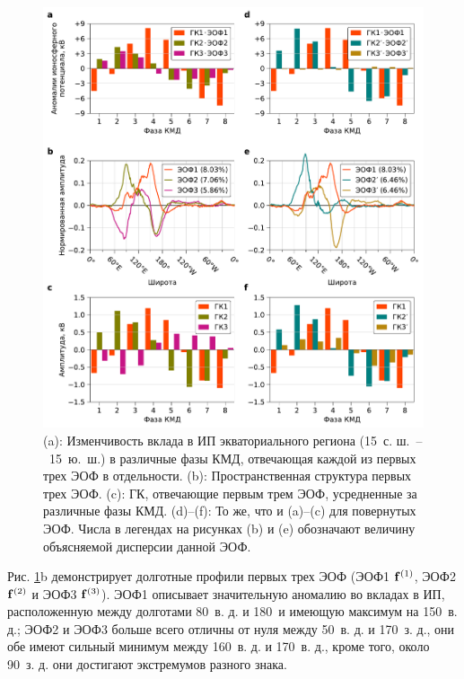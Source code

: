 \begin{figure}[htbp]
    \centering
    \includegraphics[width=\textwidth]{figures/eofs_and_pcs.pdf}
    \caption{(a): Изменчивость вклада в ИП экваториального региона (15\textdegree\ с. ш.~--~15\textdegree~ю.~ш.) в различные фазы КМД, отвечающая каждой из первых трех ЭОФ в отдельности. (b): Пространственная структура первых трех ЭОФ. (c): ГК, отвечающие первым трем ЭОФ, усредненные за различные фазы КМД. (d)--(f): То же, что и (a)--(c) для повернутых ЭОФ. Числа в легендах на рисунках (b) и (e) обозначают величину объясняемой дисперсии данной ЭОФ.}
    \label{fig:eofs_and_pcs}
\end{figure}

Рис. \ref{fig:eofs_and_pcs}{b} демонстрирует долготные профили первых трех ЭОФ (ЭОФ1 $\vb{f}^{(1)}$, ЭОФ2 $\vb{f}^{(2)}$ и ЭОФ3 $\vb{f}^{(3)}$). ЭОФ1 описывает значительную аномалию во вкладах в ИП, расположенную между долготами 80\textdegree\ в. д. и 180\textdegree\ и имеющую максимум на 150\textdegree\ в. д.; ЭОФ2 и ЭОФ3 больше всего отличны от нуля между 50\textdegree\ в. д. и 170\textdegree\ з. д., они обе имеют сильный минимум между 160\textdegree\ в. д. и 170\textdegree\ в. д., кроме того, около 90\textdegree\ з. д. они достигают экстремумов разного знака.

